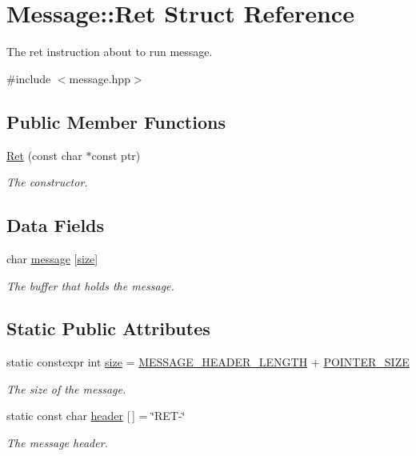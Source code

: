 \hypertarget{struct_message_1_1_ret}{}\section{Message\+:\+:Ret Struct Reference}
\label{struct_message_1_1_ret}


The \textquotesingle{}ret instruction about to run\textquotesingle{} message.  




{\ttfamily \#include $<$message.\+hpp$>$}

\subsection*{Public Member Functions}
\begin{DoxyCompactItemize}
\item 
\hyperlink{struct_message_1_1_ret_a66fb60ee425de861423a28d7c9c8e76d}{Ret} (const char $\ast$const ptr)
\begin{DoxyCompactList}\small\item\em The constructor. \end{DoxyCompactList}\end{DoxyCompactItemize}
\subsection*{Data Fields}
\begin{DoxyCompactItemize}
\item 
char \hyperlink{struct_message_1_1_ret_ad2ec4cd89746f6199effe93fffa1d5fc}{message} \mbox{[}\hyperlink{struct_message_1_1_ret_a4252f158b2b8db8901e796e51d4a99c9}{size}\mbox{]}
\begin{DoxyCompactList}\small\item\em The buffer that holds the message. \end{DoxyCompactList}\end{DoxyCompactItemize}
\subsection*{Static Public Attributes}
\begin{DoxyCompactItemize}
\item 
static constexpr int \hyperlink{struct_message_1_1_ret_a4252f158b2b8db8901e796e51d4a99c9}{size} = \hyperlink{message_8hpp_ac119f42bacd57152815371e9527d1059}{M\+E\+S\+S\+A\+G\+E\+\_\+\+H\+E\+A\+D\+E\+R\+\_\+\+L\+E\+N\+G\+TH} + \hyperlink{message_8hpp_a70eafdf190b8f3be16349543fe1b39ae}{P\+O\+I\+N\+T\+E\+R\+\_\+\+S\+I\+ZE}
\begin{DoxyCompactList}\small\item\em The size of the message. \end{DoxyCompactList}\item 
static const char \hyperlink{struct_message_1_1_ret_a6908dbbd65bf63cfacca0d8d6e269216}{header} \mbox{[}$\,$\mbox{]} = \char`\"{}R\+ET-\/\char`\"{}
\begin{DoxyCompactList}\small\item\em The message header. \end{DoxyCompactList}\end{DoxyCompactItemize}


